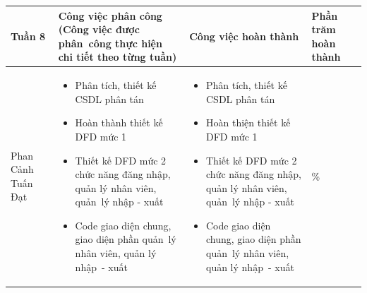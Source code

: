 \documentclass[a4paper,12pt]{report}
\begin{document}
\noindent
\begin{center}
    \begin{longtable}{|>{\centering\arraybackslash}p{3cm}|
        >{\centering\arraybackslash}p{5.5cm}|
        >{\centering\arraybackslash}p{5.5cm}|
        >{\centering\arraybackslash}p{1.5cm}|}
        \hline
        \textbf{Tuần 8}                                                                                                               &
        \textbf{Công việc phân công \newline
            (Công việc được phân~công thực hiện chi tiết theo từng tuần)
        }                                                                                                                             &
        \textbf{Công việc hoàn thành}                                                                                                 &
        \textbf{Phần trăm hoàn thành}                                                                                                         \\
        \hline
        Phan Cảnh Tuấn Đạt                                                                                                            &
        \begin{itemize}
            \item Phân tích, thiết kế CSDL phân tán
            \item Hoàn thành thiết kế DFD mức 1
            \item Thiết kế DFD mức 2 chức năng đăng nhập, quản lý nhân viên, quản~lý nhập - xuất
            \item Code giao diện chung, giao diện phần quản~lý nhân viên, quản lý nhập~- xuất
        \end{itemize}                                          &
        \begin{itemize}
            \item Phân tích, thiết kế CSDL phân tán
            \item Hoàn thiện thiết kế DFD mức 1
            \item Thiết kế DFD mức 2 chức năng đăng nhập, quản lý nhân viên, quản~lý nhập - xuất
            \item Code giao diện chung, giao diện phần quản~lý nhân viên, quản lý nhập~- xuất
        \end{itemize}
                                                                                                                                      & 100\% \\

\end{longtable}
\end{center}
\end{document}
